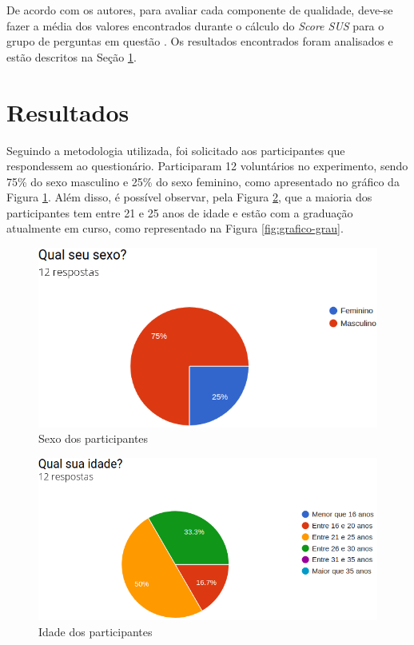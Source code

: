\par 
De acordo com os autores, para avaliar cada componente de qualidade, deve-se fazer a média dos valores encontrados durante o cálculo do \textit{Score SUS} para o grupo de perguntas 
em questão \cite{nielsen199510}. Os resultados encontrados foram analisados e estão descritos na Seção \ref{sec:resultados}. 

\section{Resultados}
\label{sec:resultados}

Seguindo a metodologia utilizada, foi solicitado aos participantes que respondessem ao questionário. Participaram 12 voluntários no experimento, sendo 75\% do sexo masculino e 25\% do sexo feminino, como apresentado no gráfico da Figura \ref{fig:grafico-sexo}. Além disso, 
é possível observar, pela Figura \ref{fig:grafico-idade}, que a maioria dos participantes tem entre 21 e 25 anos de idade e 
estão com a graduação atualmente em curso, como representado na Figura \ref{fig:grafico-grau}.

\begin{figure}[!ht]
    \centering
    \includegraphics[scale=0.4]{./figuras/sexo.png}
    \caption{Sexo dos participantes}
    \label{fig:grafico-sexo}
\end{figure}

\begin{figure}[!ht]
    \centering
    \includegraphics[scale=0.4]{./figuras/idade.png}
    \caption{Idade dos participantes}
    \label{fig:grafico-idade}
\end{figure}

